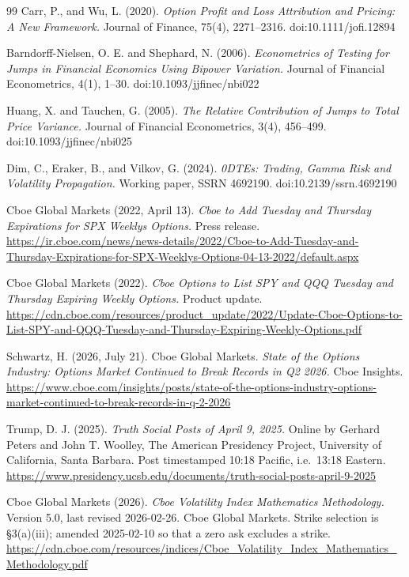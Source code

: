 \documentclass[11pt]{article}
\begin{document}
\begin{thebibliography}{99}
Carr, P., and Wu, L. (2020).
\textit{Option Profit and Loss Attribution and Pricing: A New Framework.}
Journal of Finance, 75(4), 2271--2316.
doi:10.1111/jofi.12894

Barndorff-Nielsen, O. E. and Shephard, N. (2006).
\textit{Econometrics of Testing for Jumps in Financial Economics Using Bipower Variation.}
Journal of Financial Econometrics, 4(1), 1--30.
doi:10.1093/jjfinec/nbi022

Huang, X. and Tauchen, G. (2005).
\textit{The Relative Contribution of Jumps to Total Price Variance.}
Journal of Financial Econometrics, 3(4), 456--499.
doi:10.1093/jjfinec/nbi025

Dim, C., Eraker, B., and Vilkov, G. (2024).
\textit{0DTEs: Trading, Gamma Risk and Volatility Propagation.}
Working paper, SSRN 4692190.
doi:10.2139/ssrn.4692190

Cboe Global Markets (2022, April 13).
\textit{Cboe to Add Tuesday and Thursday Expirations for SPX Weeklys Options.}
Press release. \url{https://ir.cboe.com/news/news-details/2022/Cboe-to-Add-Tuesday-and-Thursday-Expirations-for-SPX-Weeklys-Options-04-13-2022/default.aspx}

Cboe Global Markets (2022).
\textit{Cboe Options to List SPY and QQQ Tuesday and Thursday Expiring Weekly Options.}
Product update. \url{https://cdn.cboe.com/resources/product_update/2022/Update-Cboe-Options-to-List-SPY-and-QQQ-Tuesday-and-Thursday-Expiring-Weekly-Options.pdf}

Schwartz, H. (2026, July 21). Cboe Global Markets.
\textit{State of the Options Industry: Options Market Continued to Break Records in Q2 2026.}
Cboe Insights. \url{https://www.cboe.com/insights/posts/state-of-the-options-industry-options-market-continued-to-break-records-in-q-2-2026}

Trump, D. J. (2025).
\textit{Truth Social Posts of April 9, 2025.}
Online by Gerhard Peters and John T. Woolley, The American Presidency Project, University of California, Santa Barbara.
Post timestamped 10:18 Pacific, i.e.\ 13:18 Eastern.
\url{https://www.presidency.ucsb.edu/documents/truth-social-posts-april-9-2025}

Cboe Global Markets (2026).
\textit{Cboe Volatility Index Mathematics Methodology.}
Version 5.0, last revised 2026-02-26. Cboe Global Markets. Strike selection is \S3(a)(iii); amended 2025-02-10 so that a zero ask excludes a strike.
\url{https://cdn.cboe.com/resources/indices/Cboe_Volatility_Index_Mathematics_Methodology.pdf}


\end{thebibliography}
\end{document}
